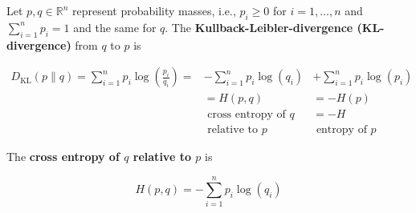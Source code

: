 \begin{definition}
    Let $p, q \in \mathbb{R}^{n}$ represent probability masses, i.e., $p_{i} \geq 0$ for $i=1, \ldots, n$ and $\sum_{i=1}^{n} p_{i}=1$ and the same for $q$.
    The \textbf{Kullback-Leibler-divergence (KL-divergence)} from $q$ to $p$ is

    $$
    \begin{array}{ll}
    D_{\mathrm{KL}}(p \| q)=\displaystyle \sum_{i=1}^{n} p_{i} \log \left(\frac{p_{i}}{q_{i}}\right)= & -\displaystyle \sum_{i=1}^{n} p_{i} \log \left(q_{i}\right) & +\displaystyle \sum_{i=1}^{n} p_{i} \log \left(p_{i}\right) \\
    & =H(p, q) & =-H(p) \\
    & \text { cross entropy of } q & =-H \\
    & \text { relative to } p & \text { entropy of } p
    \end{array}
    $$

    The \textbf{cross entropy of $q$ relative to $p$} is

    $$
    H(p, q) = -\sum_{i=1}^{n} p_{i} \log \left(q_{i}\right)
    $$
\end{definition}

